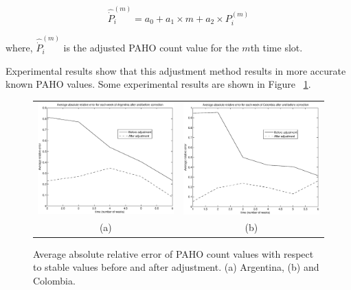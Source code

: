 \begin{equation}
\hat{\dot{P}}_i^{(m)} = a_0 + a_1 \times m + a_2 \times P_i^{(m)}
\end{equation}

where, $\hat{\dot{P}}_i^{(m)}$ is the adjusted PAHO count value for the $m$th time slot.

Experimental results show that this adjustment method results in more accurate known PAHO values. Some experimental results are shown in Figure ~\ref{fig:adjustedrelerrors}.

\begin{figure}[h]
  \centering
   \begin{tabular}{cc}
     \includegraphics[width=.45\textwidth]{fig/forPaper_absscorePerWeekAfterCorrection_avgsOfWeeks_Argentina.eps} &
     \includegraphics[width=.45\textwidth]{fig/forPaper_absscorePerWeekAfterCorrection_avgsOfWeeks_Colombia.eps} \\
      (a) & (b) \\ %
  \end{tabular}
  \caption{Average absolute relative error of PAHO count values with respect to stable values before and after adjustment.
  (a) Argentina,
  (b) and Colombia.
  }
  \label{fig:adjustedrelerrors}

\end{figure}



